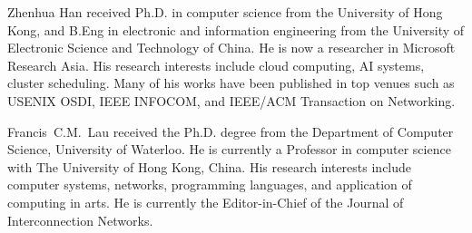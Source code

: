 \begin{IEEEbiography}{Zhenhua Han}
    received Ph.D. in computer science from the University of Hong Kong, and B.Eng in electronic and information engineering from the University of Electronic Science and Technology of China. He is now a researcher in Microsoft Research Asia. His research interests include cloud computing, AI systems, cluster scheduling. Many of his works have been published in top venues such as USENIX OSDI, IEEE INFOCOM, and IEEE/ACM Transaction on Networking.
\end{IEEEbiography}
\vspace{-1cm}

\begin{IEEEbiography}{Francis~C.M.~Lau}
    received the Ph.D. degree from the Department of Computer Science, University of Waterloo. He is currently a Professor in computer science with The University of Hong Kong, China. His research interests include computer systems, networks, programming languages, and application of computing in arts. He is currently the Editor-in-Chief of the Journal of Interconnection Networks.
\end{IEEEbiography}
\vspace{-1cm}
